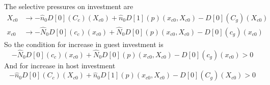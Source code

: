 \documentclass{article}
\begin{document}
The selective pressures on investment are\begin{align*}
  {X}_{{c}{0}} &\to -\hat{{n}}_{0} D[0]\left(C_{c}\right)\left({X}_{{c}{0}}\right) + \hat{{n}}_{0} D[1]\left(p\right)\left({x}_{{c}{0}}, {X}_{{c}{0}}\right) - D[0]\left(C_{g}\right)\left({X}_{{c}{0}}\right) \\
  {x}_{{c}{0}} &\to -\hat{{N}}_{0} D[0]\left(c_{c}\right)\left({x}_{{c}{0}}\right) + \hat{{N}}_{0} D[0]\left(p\right)\left({x}_{{c}{0}}, {X}_{{c}{0}}\right) - D[0]\left(c_{g}\right)\left({x}_{{c}{0}}\right)
\end{align*}So the condition for increase in guest investment is
\[-\hat{{N}}_{0} D[0]\left(c_{c}\right)\left({x}_{{c}{0}}\right) + \hat{{N}}_{0} D[0]\left(p\right)\left({x}_{{c}{0}}, {X}_{{c}{0}}\right) - D[0]\left(c_{g}\right)\left({x}_{{c}{0}}\right) > 0\]
And for increase in host investment
\[-\hat{{n}}_{0} D[0]\left(C_{c}\right)\left({X}_{{c}{0}}\right) + \hat{{n}}_{0} D[1]\left(p\right)\left({x}_{{c}{0}}, {X}_{{c}{0}}\right) - D[0]\left(C_{g}\right)\left({X}_{{c}{0}}\right) > 0\]
\end{document}
